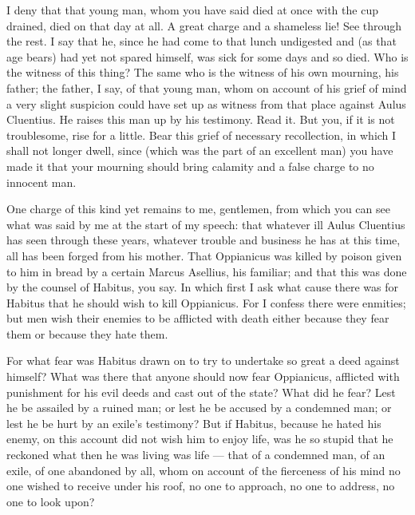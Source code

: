  I deny that that young man, whom you have said died at once with the cup drained, died on that day at all. A great charge and a shameless lie! See through the rest. I say that he, since he had come to that lunch undigested and (as that age bears) had yet not spared himself, was sick for some days and so died. Who is the witness of this thing? The same who is the witness of his own mourning, his father; the father, I say, of that young man, whom on account of his grief of mind a very slight suspicion could have set up as witness from that place against Aulus Cluentius. He raises this man up by his testimony. Read it. But you, if it is not troublesome, rise for a little. Bear this grief of necessary recollection, in which I shall not longer dwell, since (which was the part of an excellent man) you have made it that your mourning should bring calamity and a false charge to no innocent man.

 One charge of this kind yet remains to me, gentlemen, from which you can see what was said by me at the start of my speech: that whatever ill Aulus Cluentius has seen through these years, whatever trouble and business he has at this time, all has been forged from his mother. That Oppianicus was killed by poison given to him in bread by a certain Marcus Asellius, his familiar; and that this was done by the counsel of Habitus, you say. In which first I ask what cause there was for Habitus that he should wish to kill Oppianicus. For I confess there were enmities; but men wish their enemies to be afflicted with death either because they fear them or because they hate them.

 For what fear was Habitus drawn on to try to undertake so great a deed against himself? What was there that anyone should now fear Oppianicus, afflicted with punishment for his evil deeds and cast out of the state? What did he fear? Lest he be assailed by a ruined man; or lest he be accused by a condemned man; or lest he be hurt by an exile's testimony? But if Habitus, because he hated his enemy, on this account did not wish him to enjoy life, was he so stupid that he reckoned what then he was living was life --- that of a condemned man, of an exile, of one abandoned by all, whom on account of the fierceness of his mind no one wished to receive under his roof, no one to approach, no one to address, no one to look upon?

